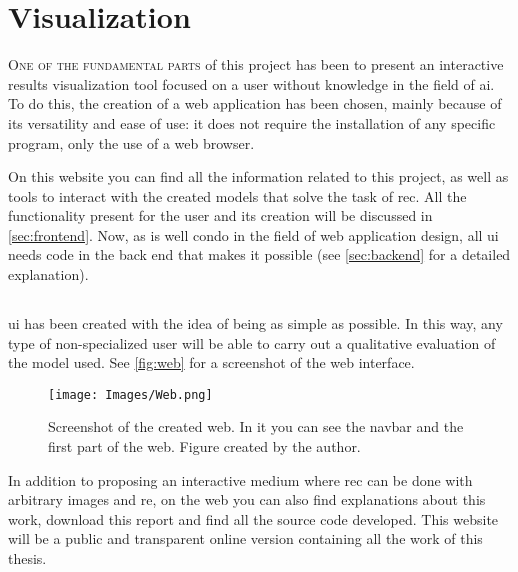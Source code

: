 

\chapter{Visualization}\label{cha:web}



\lettrine{O}{ne of the fundamental parts} of this project has been to present
an interactive results visualization tool focused on a user without knowledge
in the field of \gls{ai}. To do this, the creation of a web application has
been chosen, mainly because of its versatility and ease of use: it does not
require the installation of any specific program, only the use of a web
browser.

On this website you can find all the information related to this project, as
well as tools to interact with the created models that solve the task of
\gls{rec}. All the functionality present for the user and its creation will be
discussed in \vref{sec:frontend}. Now, as is well condo in the field of web
application design, all \gls{ui} needs code in the back end that makes it
possible (see \vref{sec:backend} for a detailed explanation).



\section{}%
\label{sec:frontend}

\gls{ui} has been created with the idea of being as simple as possible. In this
way, any type of non-specialized user will be able to carry out a qualitative
evaluation of the model used. See \vref{fig:web} for a screenshot of the web
interface.

\begin{figure}[ht]
  \centering
  \texttt{[image: Images/Web.png]}
  \caption[Screenshot of the created web]{Screenshot of the created web. In it
    you can see the navbar and the first part of the web. Figure created by the
    author.}\label{fig:web}
\end{figure}

In addition to proposing an interactive medium where \gls{rec} can be done with
arbitrary images and \gls{re}, on the web you can also find explanations about
this work, download this report and find all the source code developed. This
website will be a public and transparent online version containing all the work
of this thesis.

